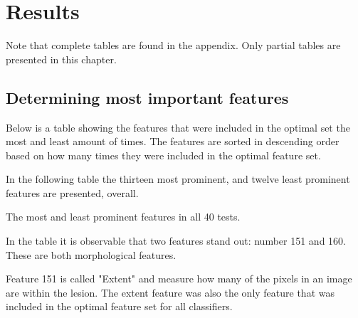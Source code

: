 \documentclass{kththesis}
\begin{document}
\chapter{Results}

Note that complete tables are found in the appendix. Only partial tables are presented in this chapter.

\section{Determining most important features}

Below is a table showing the features that were included in the optimal set the most and least amount of times. The features are sorted in descending order based on how many times they were included in the optimal feature set.

In the following table the thirteen most prominent, and twelve least prominent features are presented, overall. 



\begin{table}[h!]
  \begin{center}
    \caption{The most and least prominent features in all 40 tests.}
  \end{center}
\end{table}
\newpage
In the table it is observable that two features stand out: number 151 and 160. These are both morphological features.%

Feature 151 is called "Extent" and measure how many of the pixels in an image are within the lesion.
The extent feature was also the only feature that was included in the optimal feature set for all classifiers.
\end{document}
